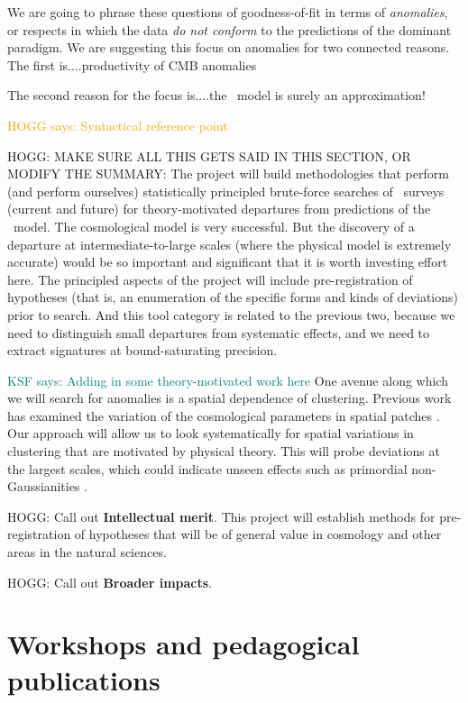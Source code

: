 \documentclass[12pt, fullpage, letterpaper]{article}
\newcommand{\KSF}[1]{\textcolor{teal}{KSF says: #1}}
\newcommand{\HOGG}[1]{\textcolor{orange}{HOGG says: #1}}
\begin{document}
We are going to phrase these questions of goodness-of-fit in terms of
\emph{anomalies}, or respects in which the data \emph{do not conform}
to the predictions of the dominant paradigm.
We are suggesting this focus on anomalies for two connected reasons.
The first is....productivity of CMB anomalies

The second reason for the focus is....the \LCDM\ model is surely an
approximation!

\HOGG{Syntactical reference point}

HOGG: MAKE SURE ALL THIS GETS SAID IN THIS SECTION, OR MODIFY THE SUMMARY:
The project will build methodologies that perform (and perform
ourselves) statistically principled brute-force searches of \LSS\ 
surveys (current and future) for theory-motivated departures from
predictions of the \LCDM\ model.
The cosmological model is very successful.
But the discovery of a departure at intermediate-to-large scales
(where the physical model is extremely accurate) would be so important
and significant that it is worth investing effort here.
The principled aspects of the project will include pre-registration of
hypotheses (that is, an enumeration of the specific forms and kinds of
deviations) prior to search.
And this tool category is related to the previous two, because we need
to distinguish small departures from systematic effects, and we need
to extract signatures at bound-saturating precision.

\KSF{Adding in some theory-motivated work here}
One avenue along which we will search for anomalies is a spatial dependence of clustering.
Previous work has examined the variation of the cosmological parameters in spatial patches \citep{Mukherjee2018}.
Our approach will allow us to look systematically for spatial variations in clustering that are motivated by physical theory.
This will probe deviations at the largest scales, which could indicate unseen effects such as primordial non-Gaussianities \citep{Dalal2008}.

HOGG: Call out \textbf{Intellectual merit}.
This project will establish methods for pre-registration of hypotheses that
will be of general value in cosmology and other areas in the natural
sciences.

HOGG: Call out \textbf{Broader impacts}.

\section{Workshops and pedagogical publications}
\end{document}
